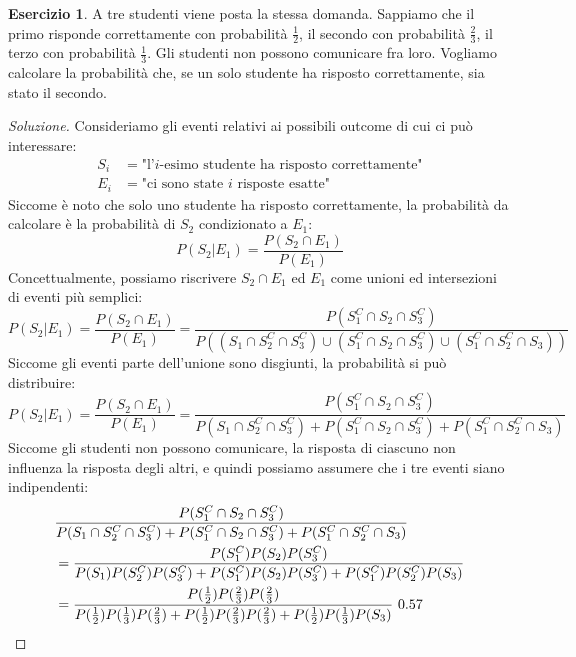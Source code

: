 \documentclass{article}
\theoremstyle{plain}
\theoremstyle{definition}
\newtheorem{esercizio}{Esercizio}[section]
\theoremstyle{remark}
\newenvironment{soluzione}
	{\renewcommand\qedsymbol{$\mathwitch*$}\begin{proof}[Soluzione]}
	{\end{proof}}
\renewcommand{\qedsymbol}{$\mathrightghost$}
\begin{document}
\begin{esercizio}
	A tre studenti viene posta la stessa domanda. Sappiamo che il primo risponde correttamente con probabilità $\frac{1}{2}$, il secondo con probabilità $\frac{2}{3}$, il terzo con probabilità $\frac{1}{3}$. Gli studenti non possono comunicare fra loro. Vogliamo calcolare la probabilità che, se un solo studente ha risposto correttamente, sia stato il secondo.
	\begin{soluzione}
		Consideriamo gli eventi relativi ai possibili outcome di cui ci può interessare:
		\begin{align*}
			S_i&=\text{"l'$i$-esimo studente ha risposto correttamente"}\\
			E_i&=\text{"ci sono state $i$ risposte esatte"}
		\end{align*}
		Siccome è noto che solo uno studente ha risposto correttamente, la probabilità da calcolare è la probabilità di $S_2$ condizionato a $E_1$:
		\begin{equation*}
			P(S_2|E_1)=\frac{P(S_2\cap E_1)}{P(E_1)}
		\end{equation*}
		Concettualmente, possiamo riscrivere $S_2\cap E_1$ ed $E_1$ come unioni ed intersezioni di eventi più semplici:
		\begin{equation*}
			P(S_2|E_1)=\frac{P(S_2\cap E_1)}{P(E_1)}=\frac{P(S_1^C\cap S_2\cap S_3^C)}{P((S_1\cap S_2^C\cap S_3^C)\cup(S_1^C\cap S_2\cap S_3^C)\cup(S_1^C\cap S_2^C\cap S_3))}
		\end{equation*}
		Siccome gli eventi parte dell'unione sono disgiunti, la probabilità si può distribuire:
		\begin{equation*}
			P(S_2|E_1)=\frac{P(S_2\cap E_1)}{P(E_1)}=\frac{P(S_1^C\cap S_2\cap S_3^C)}{P(S_1\cap S_2^C\cap S_3^C)+P(S_1^C\cap S_2\cap S_3^C)+P(S_1^C\cap S_2^C\cap S_3)}
		\end{equation*}
		Siccome gli studenti non possono comunicare, la risposta di ciascuno non influenza la risposta degli altri, e quindi possiamo assumere che i tre eventi siano indipendenti:
		\begin{align*}
			&\frac{P(S_1^C\cap S_2\cap S_3^C)}{P(S_1\cap S_2^C\cap S_3^C)+P(S_1^C\cap S_2\cap S_3^C)+P(S_1^C\cap S_2^C\cap S_3)}\\
			&=\frac{P(S_1^C)P(S_2)P(S_3^C)}{P(S_1)P(S_2^C)P(S_3^C)+P(S_1^C)P(S_2)P(S_3^C)+P(S_1^C)P(S_2^C)P(S_3)}\\
			&=\frac{P(\frac{1}{2})P(\frac{2}{3})P(\frac{2}{3})}{P(\frac{1}{2})P(\frac{1}{3})P(\frac{2}{3})+P(\frac{1}{2})P(\frac{2}{3})P(\frac{2}{3})+P(\frac{1}{2})P(\frac{1}{3})P(S_3)}~0.57\qedhere
		\end{align*}
	\end{soluzione}
\end{esercizio}
\end{document}

